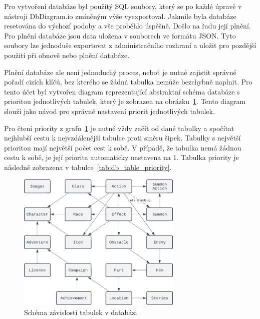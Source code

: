 Pro vytvoření databáze byl použitý SQL soubory, který se po každé úpravě v nástroji DbDiagram.io zmíněným výše vyexportoval. Jakmile byla databáze resetována do výchozí podoby a vše proběhlo úspěšně. Došlo na řadu její plnění. Pro plnění databáze jsou data uložena v souborech ve formátu JSON. Tyto soubory lze jednoduše exportovat z administračního rozhraní a uložit pro pozdější použití při obnově nebo plnění databáze.

Plnění databáze ale není jednoduchý proces, neboť je nutné zajistit správné pořadí cizích klíčů, bez kterého se žádná tabulka nemůže bezchybně naplnit. Pro tento účet byl vytvořen diagram reprezentující abstraktní schéma databáze s prioritou jednotlivých tabulek, který je zobrazen na obrázku~\ref{fig:db_table_priority}. Tento diagram slouží jako návod pro správné nastavení priorit jednotlivých tabulek.

Pro čtení priority z grafu~\ref{fig:db_table_priority} je nutné vždy začít od dané tabulky a spočítat nejhlubší cestu k nejvzdálenější tabulce proti směru šipek. Tabulky s největší prioritou mají největší počet cest k sobě. V případě, že tabulka nemá žádnou cestu k sobě, je její priorita automaticky nastavena na 1. Tabulka priority je následně zobrazena v tabulce~\ref{tab:db_table_priority}.

\begin{figure}[H]
    \centering
    \includegraphics[width=0.7\textwidth]{diagrams/databasePriority}
    \caption{Schéma závislosti tabulek v databázi}
    \label{fig:db_table_priority}
\end{figure}

